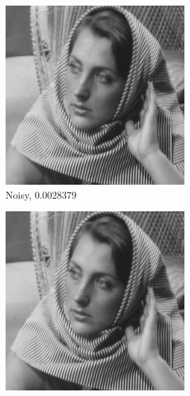 \documentclass[a4paper]{article}
\begin{document}
\begin{figure}[H]
    \centering
    \begin{subfigure}{0.24\linewidth}
        \centering
        \includegraphics[width = \linewidth]{haarWavelet/barbara256 reconstructed using all measurements, with noise.png}
        \caption{Noisy, 0.0028379}
    \end{subfigure}
    \begin{subfigure}{0.24\linewidth}
        \centering
        \includegraphics[width = \linewidth]{haarWavelet/barbara256 reconstructed using all measurements, without noise.png}

\end{subfigure}
\end{figure}
\end{document}
